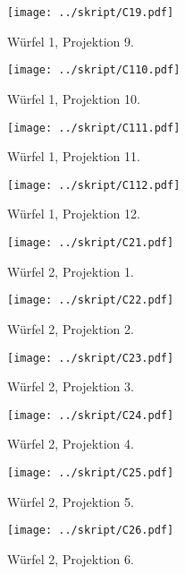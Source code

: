 \begin{figure}[htbp]
	\begin{minipage}{0.5\textwidth}
	\texttt{[image: ../skript/C19.pdf]}
	\caption{Würfel 1, Projektion 9.}
	\end{minipage}
	\hfill
	\begin{minipage}{0.5\textwidth}
	\texttt{[image: ../skript/C110.pdf]}
	\caption{Würfel 1, Projektion 10.}
	\end{minipage}
\end{figure}
 \clearpage
\begin{figure}[htbp]
	\begin{minipage}{0.5\textwidth}
	\texttt{[image: ../skript/C111.pdf]}
	\caption{Würfel 1, Projektion 11.}
	\end{minipage}
	\hfill
	\begin{minipage}{0.5\textwidth}
	\texttt{[image: ../skript/C112.pdf]}
	\caption{Würfel 1, Projektion 12.}
	\end{minipage}
\end{figure}
\begin{figure}[htbp]
	\begin{minipage}{0.5\textwidth}
	\texttt{[image: ../skript/C21.pdf]}
	\caption{Würfel 2, Projektion 1.}
	\end{minipage}
	\hfill
	\begin{minipage}{0.5\textwidth}
	\texttt{[image: ../skript/C22.pdf]}
	\caption{Würfel 2, Projektion 2.}
	\end{minipage}
\end{figure}

\begin{figure}[htbp]
	\begin{minipage}{0.5\textwidth}
	\texttt{[image: ../skript/C23.pdf]}
	\caption{Würfel 2, Projektion 3.}
	\end{minipage}
	\hfill
	\begin{minipage}{0.5\textwidth}
	\texttt{[image: ../skript/C24.pdf]}
	\caption{Würfel 2, Projektion 4.}
	\end{minipage}
\end{figure}

\begin{figure}[htbp]
	\begin{minipage}{0.5\textwidth}
	\texttt{[image: ../skript/C25.pdf]}
	\caption{Würfel 2, Projektion 5.}
	\end{minipage}
	\hfill
	\begin{minipage}{0.5\textwidth}
	\texttt{[image: ../skript/C26.pdf]}
	\caption{Würfel 2, Projektion 6.}
	\end{minipage}
\end{figure}

